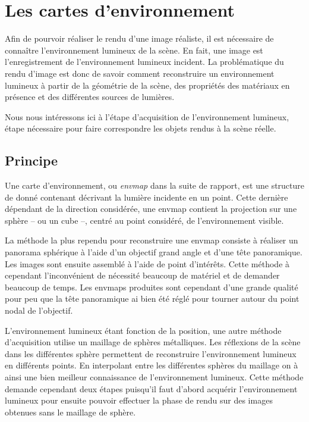 \documentclass[10pt,a4paper,twoside, twocolumn]{report}
\begin{document}
\iftwocolumn \twocolumn \else \onecolumn \fi


\chapter{Les cartes d’environnement}


Afin de pourvoir réaliser le rendu d’une image réaliste, il est nécessaire de connaître l’environnement lumineux de la scène. En fait, une image est l’enregistrement de l’environnement lumineux incident. La problématique du rendu d’image est donc de savoir comment reconstruire un environnement lumineux à partir de la géométrie de la scène, des propriétés des matériaux en présence et des différentes sources de lumières.

Nous nous intéressons ici à l’étape d’acquisition de l’environnement lumineux, étape nécessaire pour faire correspondre les objets rendus à la scène réelle.


\section{Principe}

Une carte d’environnement, ou \emph{envmap} dans la suite de rapport, est une structure de donné contenant décrivant la lumière incidente en un point. Cette dernière dépendant de la direction considérée, une envmap contient la projection sur une sphère -- ou un cube --, centré au point considéré, de l’environnement visible.

La méthode la plus rependu pour reconstruire une envmap consiste à réaliser un panorama sphérique à l’aide d’un objectif grand angle et d’une tête panoramique. Les images sont ensuite assemblé à l’aide de point d’intérêts. Cette méthode à cependant l’inconvénient de nécessité beaucoup de matériel et de demander beaucoup de temps. Les envmaps produites sont cependant d’une grande qualité pour peu que la tête panoramique ai bien été réglé pour tourner autour du point nodal de l’objectif.

L’environnement lumineux étant fonction de la position, une autre méthode d’acquisition utilise un maillage de sphères métalliques. Les réflexions de la scène dans les différentes sphère permettent de reconstruire l’environnement lumineux en différents points. En interpolant entre les différentes sphères du maillage on à ainsi une bien meilleur connaissance de l’environnement lumineux. Cette méthode demande cependant deux étapes puisqu’il faut d’abord acquérir l’environnement lumineux pour ensuite pouvoir effectuer la phase de rendu sur des images obtenues sans le maillage de sphère.
\end{document}

